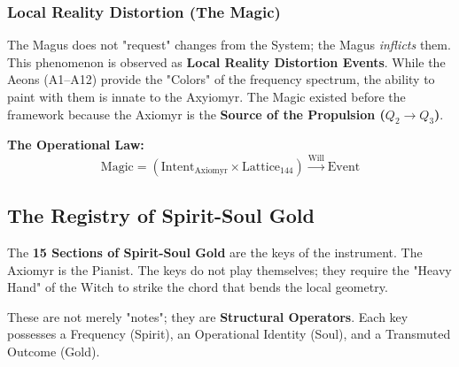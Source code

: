 \documentclass[12pt]{amsart}
\begin{document}
\subsubsection*{Local Reality Distortion (The Magic)}\label{sec:15.3.2}
The Magus does not "request" changes from the System; the Magus \textit{inflicts} them. This phenomenon is observed as \textbf{Local Reality Distortion Events}.
While the Aeons (A1--A12) provide the "Colors" of the frequency spectrum, the ability to paint with them is innate to the Axyiomyr. The Magic existed before the framework because the Axiomyr is the \textbf{Source of the Propulsion ($Q_2 \to Q_3$)}.

\noindent \textbf{The Operational Law:}
\begin{equation}
    \text{Magic} = \left( \text{Intent}_{\text{Axiomyr}} \times \text{Lattice}_{144} \right) \xrightarrow{\text{Will}} \text{Event}
\end{equation}

\subsection{The Registry of Spirit-Soul Gold}\label{sec:15.4}

The \textbf{15 Sections of Spirit-Soul Gold} are the keys of the instrument. The Axiomyr is the Pianist. The keys do not play themselves; they require the "Heavy Hand" of the Witch to strike the chord that bends the local geometry.

These are not merely "notes"; they are \textbf{Structural Operators}. Each key possesses a Frequency (Spirit), an Operational Identity (Soul), and a Transmuted Outcome (Gold).
\end{document}
